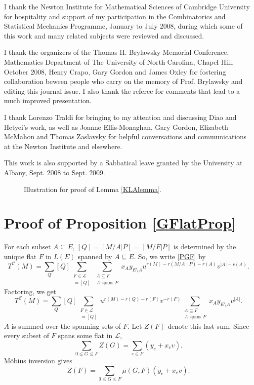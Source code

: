 \documentclass[12pt,leqno]{amsart}
\theoremstyle{remark}
\begin{document}
I thank
the Newton Institute for Mathematical Sciences
of Cambridge University for hospitality and support of my
participation in the Combinatorics and Statistical Mechanics
Programme, January to July 2008, during which some of this
work and many related subjects were reviewed and discussed.

I thank the organizers of 
the Thomas H. Brylawsky Memorial Conference, Mathematics Department of
The University of North Carolina, Chapel Hill, October 2008, 
Henry Crapo, Gary Gordon and James Oxley
for
fostering collaboration beween people who carry
on the memory of Prof. Brylawsky and editing this journal
issue.   I also thank the referee for comments that
lead to a much improved presentation.

I thank Lorenzo Traldi for bringing to my attention and
discussing Diao and Hetyei's work, as well as
Joanne Ellis-Monaghan, Gary Gordon, Elizabeth McMahon
and Thomas Zaslavsky for helpful conversations and communications
at the Newton Institute and elsewhere.

This work is also supported by a Sabbatical leave granted
by the University at Albany, Sept. 2008 to Sept. 2009.




\appendix

\begin{figure}

\caption{\label{Venn} Illustration for proof of Lemma \ref{KLAlemma}.}
\end{figure}



\section{Proof of Proposition \ref{GFlatProp}}

For each subset $A\subseteq E$, 
$[Q] = [M/A|P] = [M/F|P]$ is determined by the unique flat $F$
in $L(E)$ spanned by $A\subseteq E$.  So, we write \eqref{PGF}
by
\[
T^{\mathcal{C}}(M) = 
     \sum_{Q} [Q] \sum_{\substack{
                     F\in \mathcal{L}\\
                     [M/F|P]=[Q]
                      }}
      \sum_{\substack{
             A\subseteq F\\
             A\text{ spans }F
          }}
      x_A y_{E\setminus A}
      u^{r(M)-r(M/A\mid P)-r(A)}
      v^{|A|-r(A)}.
\]
Factoring, we get
\[
T^{\mathcal{C}}(M) = 
     \sum_{Q} [Q] \sum_{\substack{
                     F\in \mathcal{L}\\
                     [M/F|P]=[Q]
                      }}
      u^{r(M)-r(Q)-r(F)}
      v^{-r(F)}
      \sum_{\substack{
             A\subseteq F\\
             A\text{ spans }F
          }}
      x_A y_{E\setminus A}
      v^{|A|}.
\]
$A$ is summed over the spanning sets of $F$.  Let $Z(F)$ denote
this last sum.  Since every subset of $F$ spans some flat
in $\mathcal{L}$,
\[
\sum_{0\le G \le F}Z(G) = \sum_{e\in F}(y_e + x_ev).
\]
M\"{o}bius inversion gives
\[
Z(F)= \sum_{0\le G\le F}\mu(G,F)(y_e +  x_ev).
\]
\end{document}
